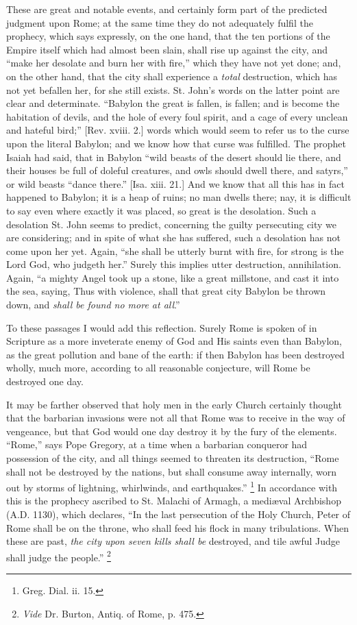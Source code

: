 These are great and notable events, and certainly form part of the
predicted judgment upon Rome; at the same time they do not adequately
fulfil the prophecy, which says expressly, on the one hand, that the
ten portions of the Empire itself which had almost been slain, shall
rise up against the city, and ``make her desolate and burn her
with fire,'' which they have not yet done; and, on the other hand,
that the city shall experience a \emph{total} destruction, which has
not yet befallen her, for she still exists. St. John's words on the
latter point are clear and determinate. ``Babylon the great is
fallen, is fallen; and is become the habitation of devils, and the
hole of every foul spirit, and a cage of every unclean and hateful
bird;'' [Rev. xviii. 2.] words which would seem to refer us to the
curse upon the literal Babylon; and we know how that curse was
fulfilled. The prophet Isaiah had said, that in Babylon ``wild
beasts of the desert should lie there, and their houses be full of
doleful creatures, and owls should dwell there, and satyrs,'' or
wild beasts ``dance there.'' [Isa. xiii. 21.] And we know
that all this has in fact happened to Babylon; it is a heap of ruins;
no man dwells there; nay, it is difficult to say even where exactly it
was placed, so great is the desolation. Such a desolation St. John
seems to predict, concerning the guilty persecuting city we are
considering; and in spite of what she has suffered, such a desolation
has not come upon her yet. Again, ``she shall be utterly burnt
with fire, for strong is the Lord God, who judgeth her.'' Surely
this implies utter destruction, annihilation. Again, ``a mighty
Angel took up a stone, like a great millstone, and cast it into the
sea, saying, Thus with violence, shall that great city Babylon be
thrown down, and \emph{shall be found no more at all}.''

To these passages I would add this reflection. Surely Rome is
spoken of in Scripture as a more inveterate enemy of God and His
saints even than Babylon, as the great pollution and bane of the
earth: if then Babylon has been destroyed wholly, much more, according
to all reasonable conjecture, will Rome be destroyed one day.

It may be farther observed that holy men in the early Church
certainly thought that the barbarian invasions were not all that Rome
was to receive in the way of vengeance, but that God would one day
destroy it by the fury of the elements. ``Rome,'' says Pope
Gregory, at a time when a barbarian conqueror had possession of the
city, and all things seemed to threaten its destruction, ``Rome
shall not be destroyed by the nations, but shall consume away
internally, worn out by storms of lightning, whirlwinds, and
earthquakes.'' \footnote{Greg. Dial. ii. 15.} In
accordance with this is the prophecy ascribed to St. Malachi of Armagh,
a mediæval Archbishop (A.D. 1130), which declares, ``In the last
persecution of the Holy Church, Peter of Rome shall be on the
throne, who shall feed his flock in many tribulations. When these are
past, \emph{the city upon seven kills shall be} destroyed, and tile
awful Judge shall judge the people.'' \footnote{\emph{Vide} Dr. Burton, Antiq. of Rome, p.
475.}

